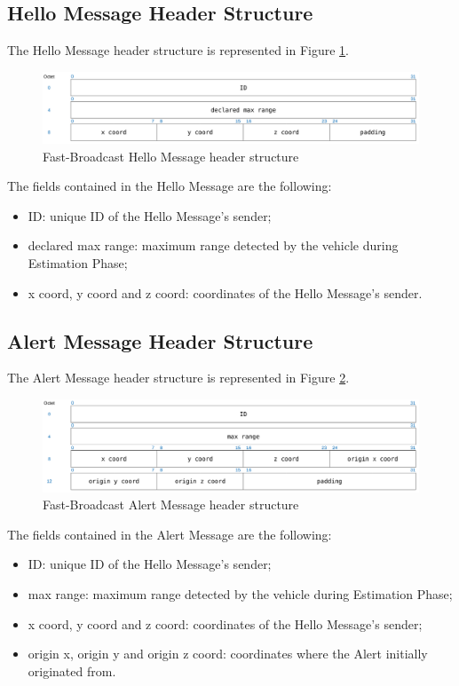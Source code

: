 		\subsection{Hello Message Header Structure}
			The Hello Message header structure is represented in Figure \ref{fig:fbHelloHeader}.
			\begin{figure}[H]
				\centering
				\includegraphics[width=\textwidth]{immagini/fbHelloHeader}
				\caption{Fast-Broadcast Hello Message header structure}
				\label{fig:fbHelloHeader}
			\end{figure}
			
			The fields contained in the Hello Message are the following:
			\begin{itemize}
				\item ID: unique ID of the Hello Message's sender;
				\item declared max range: maximum range detected by the vehicle during Estimation Phase;
				\item x coord, y coord and z coord: coordinates of the Hello Message's sender.
			\end{itemize}
		
		\subsection{Alert Message Header Structure}
			The Alert Message header structure is represented in Figure \ref{fig:fbAlertHeader}.
			\begin{figure}[H]
				\centering
				\includegraphics[width=\textwidth]{immagini/fbAlertHeader}
				\caption{Fast-Broadcast Alert Message header structure}
				\label{fig:fbAlertHeader}
			\end{figure}
		
		The fields contained in the Alert Message are the following:
			\begin{itemize}
				\item ID: unique ID of the Hello Message's sender;
				\item max range: maximum range detected by the vehicle during Estimation Phase;
				\item x coord, y coord and z coord: coordinates of the Hello Message's sender;
				\item origin x, origin y and origin z coord: coordinates where the Alert initially originated from.
			\end{itemize}
	
